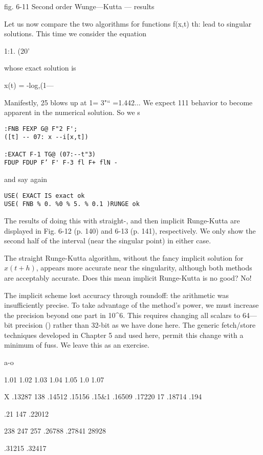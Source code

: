{{ 

fig. 6-11 Second order Wunge—Kutta — results

Let us now compare the two algorithms for functions f(x,t) th:
lead to singular solutions. This time we consider the equation

1:1. (20'

whose exact solution is

x(t) = -log,(1—%

Manifestly, 25 blows up at 1= 3"“ =1.442... We expect 111
behavior to become apparent in the numerical solution. So we s

\begin{lstlisting}
:FNB FEXP G@ F"2 F';
([t] -- 07: x --i[x,t])

:EXACT F-1 TG@ (07:--t"3)
FDUP FDUP F’ F' F-3 fl F+ flN -
\end{lstlisting}

and say again
\begin{lstlisting}
USE( EXACT IS exact ok
USE( FNB % 0. %0 % 5. % 0.1 )RUNGE ok
\end{lstlisting}

The results of doing this with straight-, and then implicit Runge-Kutta are displayed in Fig. 6-12 (p. 140) and 6-13 (p. 141), respectively. We only show the second half of the interval (near the singular point) in either case.

The straight Runge-Kutta algorithm, without the fancy implicit solution for $x(t +h)$, appears more accurate near the singularity, although both methods are acceptably accurate. Does this mean implicit Runge-Kutta is no good? No!

The implicit scheme lost accuracy through roundoff: the arithmetic was insufficiently precise. To take advantage of the method’s power, we must increase the precision beyond one part in 10^{6}. This requires changing all scalars to 64—bit precision () rather than 32-bit as we have done here. The generic fetch/store techniques developed in Chapter 5 and used here, permit this change with a minimum of fuss. We leave this as an exercise.

a-o

1.01%
1.02%
1.03%
1.04%
1.05%
1.0%
1.07%

X
.13287
138%
.14512
.15156
.15&1
.16509
.17220
17%
.18714
.194%

.21 147
.22012

238%
247%
257%
.26788
.27841
28928

.31215
.32417

}}
